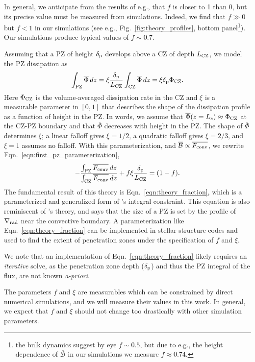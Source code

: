 \documentclass[twocolumn, linenumbers]{aastex631}
\newcommand{\gradrad}{\ensuremath{\nabla_{\rm{rad}}}}
\newcommand{\delp}{\ensuremath{\delta_{\rm{p}}}}
\newcommand{\Fconv}{\ensuremath{F_{\rm{conv}}}}
\renewcommand{\bar}[1]{\overline{#1}}
\newcommand{\editone}[1]{#1}
\begin{document}
In general, we anticipate from the results of e.g., \citet{currie_browning_2017} that $f$ is closer to 1 than 0, but its precise value must be measured from simulations.
Indeed, we find that $f \gg 0$ but $f < 1$ in our simulations (see e.g., Fig.~\ref{fig:theory_profiles}, bottom panel\footnote{the bulk dynamics suggest by eye $f \sim 0.5$, but due to e.g., the height dependence of $\bar{\mathcal{B}}$ in our simulations we measure $f \approx 0.74$.}).
Our simulations produce typical values of $f \sim 0.7$.

Assuming that a PZ of height $\delp$ develops above a CZ of depth $L_{\rm{CZ}}$, we model the PZ dissipation as
\begin{equation}
\int_{\rm{PZ}} \bar{\Phi}\,dz = \xi\frac{\delp}{L_{\rm{CZ}}}\int_{\rm{CZ}}\bar{\Phi}\,dz = \xi \delp \Phi_{\rm{CZ}}.
\label{eqn:xi_defn}
\end{equation}
Here $\Phi_{\rm{CZ}}$ is the volume-averaged dissipation rate in the CZ and $\xi$ is a measurable parameter in ${[0, 1]}$ that describes the shape of the dissipation profile as a function of height in the PZ.
In words, we assume that $\bar{\Phi}(z = L_s) \approx \Phi_{\rm{CZ}}$ at the CZ-PZ boundary and that $\bar{\Phi}$ decreases with height in the PZ.
The shape of $\bar{\Phi}$ determines $\xi$; a linear falloff gives $\xi = 1/2$, a quadratic falloff gives $\xi = 2/3$, and $\xi = 1$ assumes no falloff.
With this parameterization, and $\bar{\mathcal{B}} \propto \bar{\Fconv}$, we rewrite Eqn.~\ref{eqn:first_pz_parameterization},
\begin{equation}
-\frac{\int_{\rm{PZ}}\bar{\Fconv}\,dz}{\int_{\rm{CZ}}\bar{\Fconv}\,dz} + f\xi\frac{\delp}{L_{\rm{CZ}}}
= (1 - f).
\label{eqn:theory_fraction}
\end{equation}
The fundamental result of this theory is Eqn.~\ref{eqn:theory_fraction}, which is a parameterized and generalized form of \citet{roxburgh1989}'s integral constraint.
This equation is also reminiscent of \citet{zahn1991}'s theory, and says that the size of a PZ is set by the profile of $\gradrad$ near the convective boundary.
A parameterization like Eqn.~\ref{eqn:theory_fraction} can be implemented in stellar structure codes and used to find the extent of penetration zones under the specification of $f$ and $\xi$.
\editone{
    We note that an implementation of Eqn.~\ref{eqn:theory_fraction} likely requires an \emph{iterative} solve, as the penetration zone depth ($\delp$) and thus the PZ integral of the flux, are not known \emph{a-priori}.
}
The parameters $f$ and $\xi$ are measurables which can be constrained by direct numerical simulations, and we will measure their values in this work.
In general, we expect that $f$ and $\xi$ should not change too drastically with other simulation parameters.
\end{document}
